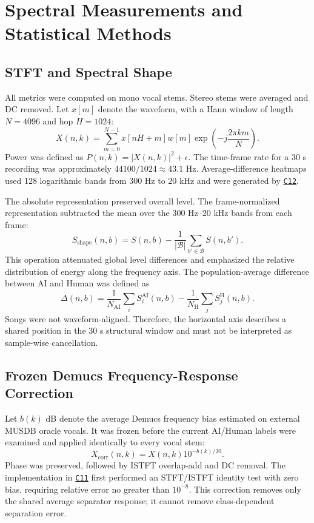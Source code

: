 \documentclass[11pt,a4paper]{article}
\newcommand{\coderef}[1]{\hyperlink{code:#1}{\texttt{#1}}}
\begin{document}
\section{Spectral Measurements and Statistical Methods}
\label{sec:method}

\subsection{STFT and Spectral Shape}

All metrics were computed on mono vocal stems. Stereo stems were averaged and DC removed. Let $x[m]$ denote the waveform, with a Hann window of length $N=4096$ and hop $H=1024$:
\begin{equation}
X(n,k)=\sum_{m=0}^{N-1}x[nH+m]w[m]\exp\!\left(-j\frac{2\pi km}{N}\right).
\label{eq:stft}
\end{equation}
Power was defined as $P(n,k)=|X(n,k)|^2+\epsilon$. The time-frame rate for a 30 s recording was approximately $44100/1024\approx43.1$ Hz. Average-difference heatmaps used 128 logarithmic bands from 300 Hz to 20 kHz and were generated by \coderef{C12}.

The absolute representation preserved overall level. The frame-normalized representation subtracted the mean over the 300 Hz--20 kHz bands from each frame:
\begin{equation}
S_{\mathrm{shape}}(n,b)=S(n,b)-\frac{1}{|\mathcal{B}|}\sum_{b'\in\mathcal{B}}S(n,b').
\label{eq:shape}
\end{equation}
This operation attenuated global level differences and emphasized the relative distribution of energy along the frequency axis. The population-average difference between AI and Human was defined as
\begin{equation}
\Delta(n,b)=\frac{1}{N_{\mathrm{AI}}}\sum_i S_i^{\mathrm{AI}}(n,b)
-\frac{1}{N_{\mathrm{H}}}\sum_j S_j^{\mathrm{H}}(n,b).
\label{eq:average-diff}
\end{equation}
Songs were not waveform-aligned. Therefore, the horizontal axis describes a shared position in the 30 s structural window and must not be interpreted as sample-wise cancellation.

\subsection{Frozen Demucs Frequency-Response Correction}

Let $b(k)$ dB denote the average Demucs frequency bias estimated on external MUSDB oracle vocals. It was frozen before the current AI/Human labels were examined and applied identically to every vocal stem:
\begin{equation}
X_{\mathrm{corr}}(n,k)=X(n,k)10^{-b(k)/20}.
\label{eq:bias-correction}
\end{equation}
Phase was preserved, followed by ISTFT overlap-add and DC removal. The implementation in \coderef{C11} first performed an STFT/ISTFT identity test with zero bias, requiring relative error no greater than $10^{-8}$. This correction removes only the shared average separator response; it cannot remove class-dependent separation error.
\end{document}
